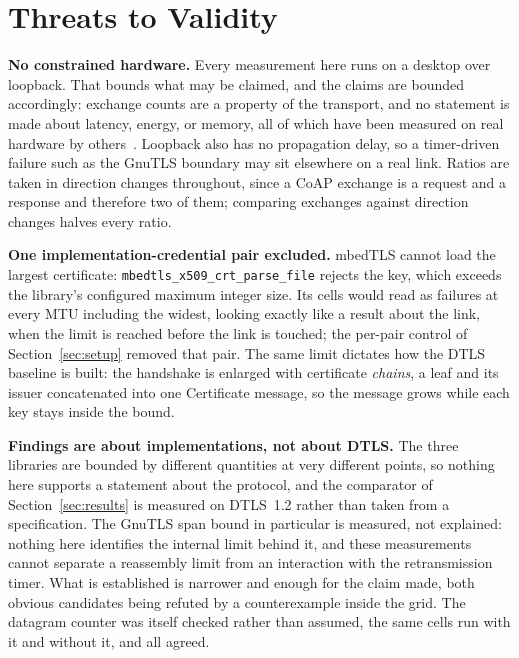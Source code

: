 %
%
%

\section{Threats to Validity}
\label{sec:threats}

\textbf{No constrained hardware.} Every measurement here runs on a desktop over loopback. That
bounds what may be claimed, and the claims are bounded accordingly: exchange counts are a
property of the transport, and no statement is made about latency, energy, or memory, all of
which have been measured on real hardware by
others~\cite{claeys2021,fraile2021,fraile2025}. Loopback also has no propagation delay, so a
timer-driven failure such as the GnuTLS boundary may sit elsewhere on a real link. Ratios are
taken in direction changes throughout, since a CoAP exchange is a request and a response and
therefore two of them; comparing exchanges against direction changes halves every ratio.

\textbf{One implementation-credential pair excluded.} mbedTLS cannot load the largest
certificate: \texttt{mbedtls\_x509\_crt\_parse\_file} rejects the key, which exceeds the
library's configured maximum integer size. Its cells would read as failures at every MTU
including the widest, looking exactly like a result about the link, when the limit is reached
before the link is touched; the per-pair control of Section~\ref{sec:setup} removed that pair.
The same limit dictates how the DTLS baseline is built: the handshake is enlarged with
certificate \emph{chains}, a leaf and its issuer concatenated into one Certificate message, so
the message grows while each key stays inside the bound.

\textbf{Findings are about implementations, not about DTLS.} The three libraries are bounded by
different quantities at very different points, so nothing here supports a statement about the
protocol, and the comparator of Section~\ref{sec:results} is measured on DTLS~1.2 rather than
taken from a specification. The GnuTLS span bound in particular is measured, not explained:
nothing here identifies the internal limit behind it, and these measurements cannot separate a
reassembly limit from an interaction with the retransmission timer. What is established is
narrower and enough for the claim made, both obvious candidates being refuted by a
counterexample inside the grid. The datagram counter was itself checked rather than assumed, the
same cells run with it and without it, and all \numRelayCtrlCells{} agreed.

